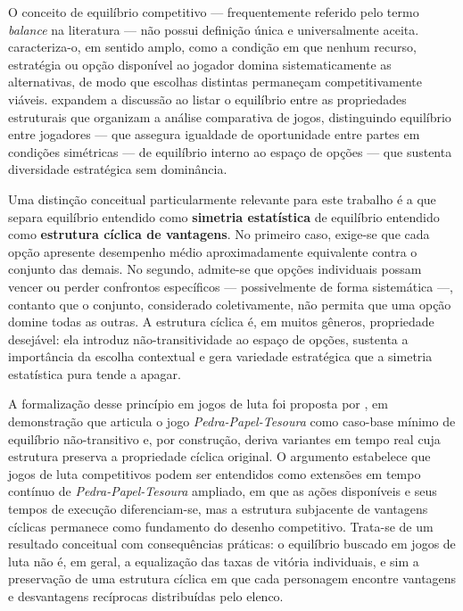 O conceito de equilíbrio competitivo --- frequentemente referido pelo termo \textit{balance} na literatura --- não possui definição única e universalmente aceita.  caracteriza-o, em sentido amplo, como a condição em que nenhum recurso, estratégia ou opção disponível ao jogador domina sistematicamente as alternativas, de modo que escolhas distintas permaneçam competitivamente viáveis.  expandem a discussão ao listar o equilíbrio entre as propriedades estruturais que organizam a análise comparativa de jogos, distinguindo equilíbrio entre jogadores --- que assegura igualdade de oportunidade entre partes em condições simétricas --- de equilíbrio interno ao espaço de opções --- que sustenta diversidade estratégica sem dominância.

Uma distinção conceitual particularmente relevante para este trabalho é a que separa equilíbrio entendido como \textbf{simetria estatística} de equilíbrio entendido como \textbf{estrutura cíclica de vantagens}. No primeiro caso, exige-se que cada opção apresente desempenho médio aproximadamente equivalente contra o conjunto das demais. No segundo, admite-se que opções individuais possam vencer ou perder confrontos específicos --- possivelmente de forma sistemática ---, contanto que o conjunto, considerado coletivamente, não permita que uma opção domine todas as outras. A estrutura cíclica é, em muitos gêneros, propriedade desejável: ela introduz não-transitividade ao espaço de opções, sustenta a importância da escolha contextual e gera variedade estratégica que a simetria estatística pura tende a apagar.

A formalização desse princípio em jogos de luta foi proposta por , em demonstração que articula o jogo \textit{Pedra-Papel-Tesoura} como caso-base mínimo de equilíbrio não-transitivo e, por construção, deriva variantes em tempo real cuja estrutura preserva a propriedade cíclica original. O argumento estabelece que jogos de luta competitivos podem ser entendidos como extensões em tempo contínuo de \textit{Pedra-Papel-Tesoura} ampliado, em que as ações disponíveis e seus tempos de execução diferenciam-se, mas a estrutura subjacente de vantagens cíclicas permanece como fundamento do desenho competitivo. Trata-se de um resultado conceitual com consequências práticas: o equilíbrio buscado em jogos de luta não é, em geral, a equalização das taxas de vitória individuais, e sim a preservação de uma estrutura cíclica em que cada personagem encontre vantagens e desvantagens recíprocas distribuídas pelo elenco.

